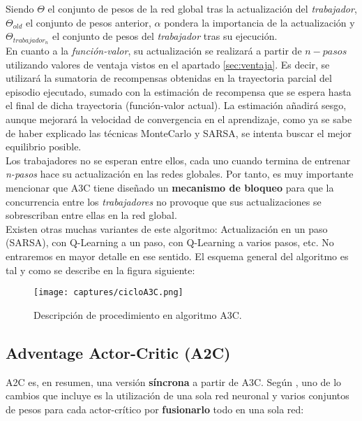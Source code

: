 \documentclass[11pt,fleqn]{book} %
\begin{document}
Siendo $\Theta$ el conjunto de pesos de la red global tras la actualización del \textit{trabajador}, $\Theta_{old}$ el conjunto de pesos anterior, $\alpha$ pondera la importancia de la actualización y $\Theta_{trabajador_n}$ el conjunto de pesos del \textit{trabajador} tras su ejecución. \\

En cuanto a la \textit{función-valor}, su actualización se realizará a partir de $n-pasos$ utilizando valores de ventaja vistos en el apartado \ref{sec:ventaja}. Es decir, se utilizará la sumatoria de recompensas obtenidas en la trayectoria parcial del episodio ejecutado, sumado con la estimación de recompensa que se espera hasta el final de dicha trayectoria (función-valor actual). La estimación añadirá sesgo, aunque mejorará la velocidad de convergencia en el aprendizaje, como ya se sabe de haber explicado las técnicas MonteCarlo y SARSA, se intenta buscar el mejor equilibrio posible.\\

Los trabajadores no se esperan entre ellos, cada uno cuando termina de entrenar \textit{n-pasos} hace su actualización en las redes globales. Por tanto, es muy importante mencionar que A3C tiene diseñado un \textbf{mecanismo de bloqueo} para que la concurrencia entre los \textit{trabajadores} no provoque que sus actualizaciones se sobrescriban entre ellas en la red global. \\

Existen otras muchas variantes de este algoritmo: Actualización en un paso (SARSA), con Q-Learning a un paso, con Q-Learning a varios pasos, etc. No entraremos en mayor detalle en ese sentido. El esquema general del algoritmo es tal y como se describe en la figura siguiente: \\

\begin{figure}[H]
	\centering\texttt{[image: captures/cicloA3C.png]}
	\caption{Descripción de procedimiento en algoritmo A3C.}
	\label{fig:cicloA3C} %
\end{figure}

\subsection{Adventage Actor-Critic (A2C)}

A2C \cite{article:A2C} es, en resumen, una versión \textbf{síncrona} a partir de A3C. Según \cite{book:miguel}, uno de lo cambios que incluye es la utilización de una sola red neuronal y varios conjuntos de pesos para cada actor-crítico por \textbf{fusionarlo} todo en una sola red:
\end{document}
